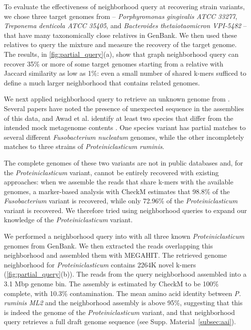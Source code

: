 To evaluate the effectiveness of neighborhood query at recovering
strain variants,
we chose three target genomes from \podarv -- {\em Porphyromonas
  gingivalis ATCC 33277}, {\em Treponema denticola ATCC 35405}, and
{\em Bacteroides thetaiotaomicron VPI-5482} -- that have many
taxonomically close relatives in GenBank. We then used these relatives
to query the \podarv mixture and measure the recovery of the target
genome.  The results, in \autoref{fig:partial_query}(a), show that
graph neighborhood query can recover 35\% or more of some target genomes
starting from a relative with Jaccard similarity as low as 1\%: even a
small number of shared k-mers sufficed to define a much larger neighborhood
that contains related genomes.


We next applied neighborhood query to retrieve an unknown genome from \podarv.
Several papers have noted the
presence of unexpected sequence in the assemblies of this data, and
Awad et al. identify at least two species that differ from
the intended mock metagenome contents \cite{megahit,Awad155358}.  One species
variant has partial matches to several different {\em
  Fusobacterium nucleatum} genomes, while the other incompletely matches to
three strains of
{\em Proteiniclasticum ruminis}.

The complete genomes of these two variants are not in public databases and, for
the {\em Proteiniclasticum} variant, cannot
be entirely recovered with existing approaches: when we
assemble the reads that share k-mers with the available genomes, a
marker-based analysis with CheckM estimates that 98.8\% of the {\em
  Fusobacterium} variant is recovered, while only 72.96\% of the {\em
  Proteiniclasticum} variant is recovered. We therefore tried using
neighborhood queries to expand our knowledge of the {\em Proteiniclasticum} variant.

We performed a neighborhood query into \podarv with all three known {\em
  Proteiniclasticum} genomes from GenBank.  We then extracted the reads
overlapping this neighborhood and assembled them with MEGAHIT.  The
retrieved genome neighborhood for {\em Proteiniclasticum} contains
2264K novel k-mers (\autoref{fig:partial_query}(b)). The reads from
the query neighborhood assembled into a 3.1 Mbp genome bin. The
assembly is estimated by CheckM to be 100\% complete, with 10.3\%
contamination.
The mean amino acid identity between {\em P. ruminis ML2} and the
neighborhood assembly is above 95\%, suggesting that this is indeed
the genome of the {\em Proteiniclasticum} variant, and that
neighborhood query retrieves a full draft genome sequence (see Supp. Material~\ref{subsec:aai}).

